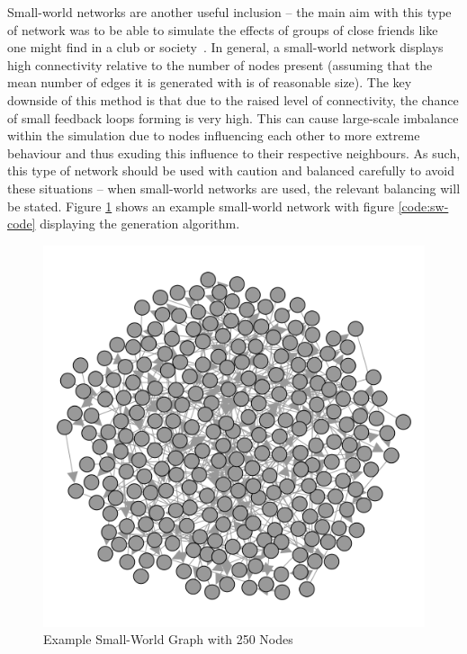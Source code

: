 \documentclass[]{report}
\begin{document}
Small-world networks are another useful inclusion – the main aim with this type of network was to be able to simulate the effects of groups of close friends like one might find in a club or society~\cite{small-world}. In general, a small-world network displays high connectivity relative to the number of nodes present (assuming that the mean number of edges it is generated with is of reasonable size). The key downside of this method is that due to the raised level of connectivity, the chance of small feedback loops forming is very high. This can cause large-scale imbalance within the simulation due to nodes influencing each other to more extreme behaviour and thus exuding this influence to their respective neighbours. As such, this type of network should be used with caution and balanced carefully to avoid these situations – when small-world networks are used, the relevant balancing will be stated. Figure \ref{img:ex-small-world} shows an example small-world network with figure \ref{code:sw-code} displaying the generation algorithm.

\begin{figure}
\label{img:ex-small-world}
\begin{center}
\includegraphics[scale=0.25]{ex-small-world.png}
\end{center}
\caption{Example Small-World Graph with 250 Nodes}
\end{figure}
\end{document}
